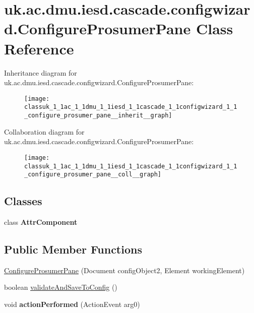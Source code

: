 \hypertarget{classuk_1_1ac_1_1dmu_1_1iesd_1_1cascade_1_1configwizard_1_1_configure_prosumer_pane}{\section{uk.\-ac.\-dmu.\-iesd.\-cascade.\-configwizard.\-Configure\-Prosumer\-Pane Class Reference}
\label{classuk_1_1ac_1_1dmu_1_1iesd_1_1cascade_1_1configwizard_1_1_configure_prosumer_pane}
}


Inheritance diagram for uk.\-ac.\-dmu.\-iesd.\-cascade.\-configwizard.\-Configure\-Prosumer\-Pane\-:\nopagebreak
\begin{figure}[H]
\begin{center}
\leavevmode
\texttt{[image: classuk\_1\_1ac\_1\_1dmu\_1\_1iesd\_1\_1cascade\_1\_1configwizard\_1\_1\_configure\_prosumer\_pane\_\_inherit\_\_graph]}
\end{center}
\end{figure}


Collaboration diagram for uk.\-ac.\-dmu.\-iesd.\-cascade.\-configwizard.\-Configure\-Prosumer\-Pane\-:\nopagebreak
\begin{figure}[H]
\begin{center}
\leavevmode
\texttt{[image: classuk\_1\_1ac\_1\_1dmu\_1\_1iesd\_1\_1cascade\_1\_1configwizard\_1\_1\_configure\_prosumer\_pane\_\_coll\_\_graph]}
\end{center}
\end{figure}
\subsection*{Classes}
\begin{DoxyCompactItemize}
\item 
class {\bfseries Attr\-Component}
\end{DoxyCompactItemize}
\subsection*{Public Member Functions}
\begin{DoxyCompactItemize}
\item 
\hyperlink{classuk_1_1ac_1_1dmu_1_1iesd_1_1cascade_1_1configwizard_1_1_configure_prosumer_pane_aa45529a6aac74f9a88aac08cc5e05648}{Configure\-Prosumer\-Pane} (Document config\-Object2, Element working\-Element)
\item 
boolean \hyperlink{classuk_1_1ac_1_1dmu_1_1iesd_1_1cascade_1_1configwizard_1_1_configure_prosumer_pane_abe7568be00047e59d6d87eb2cd521965}{validate\-And\-Save\-To\-Config} ()
\item 
\hypertarget{classuk_1_1ac_1_1dmu_1_1iesd_1_1cascade_1_1configwizard_1_1_configure_prosumer_pane_a6198f438b4cc7514e64296a22fb40a8a}{void {\bfseries action\-Performed} (Action\-Event arg0)}\label{classuk_1_1ac_1_1dmu_1_1iesd_1_1cascade_1_1configwizard_1_1_configure_prosumer_pane_a6198f438b4cc7514e64296a22fb40a8a}

\end{DoxyCompactItemize}
